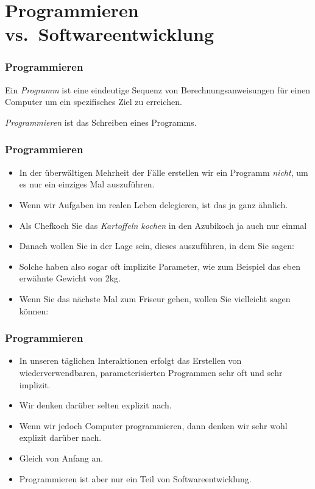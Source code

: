 \documentclass[aspectratio=169,mathserif,notheorems]{beamer}%
\begin{document}
\section{Programmieren vs.\ Softwareentwicklung}%
%
\begin{frame}%
\frametitle{Programmieren}%
%
\begin{definition}[Programm]%
Ein \emph{Programm} ist eine eindeutige Sequenz von Berechnungsanweisungen für einen Computer um ein spezifisches Ziel zu erreichen.%
\end{definition}%
%
\begin{definition}[Programmieren]%
\label{def:programming}
\emph{Programmieren} ist das Schreiben eines Programms\cite{CDE:PMOPIE}.%
\end{definition}%
%
\end{frame}%
%
\begin{frame}%
\frametitle{Programmieren}%
\begin{itemize}%
\item In der überwältigen Mehrheit der Fälle erstellen wir ein Programm \emph{nicht}, um es nur ein einziges Mal auszuführen.%
\item<2-> Wenn wir Aufgaben im realen Leben delegieren, ist das ja ganz ähnlich.
\item<3-> Als Chefkoch  Sie das  \emph{Kartoffeln kochen} in den Azubikoch ja auch nur einmal 
\item<4-> Danach wollen Sie in der Lage sein, dieses  auszuführen, in dem Sie sagen:~
\item<5-> Solche  haben also sogar oft implizite Parameter, wie zum Beispiel das eben erwähnte Gewicht von 2kg.%
\item<6-> Wenn Sie das nächste Mal zum Friseur gehen, wollen Sie vielleicht sagen können:~%
\end{itemize}%
\end{frame}%
%
\begin{frame}%
\frametitle{Programmieren}%
\begin{itemize}%
\item In unseren täglichen Interaktionen erfolgt das Erstellen von wiederverwendbaren, parameterisierten Programmen sehr oft und sehr implizit.%
\item<2-> Wir denken darüber selten explizit nach.%
\item<3-> Wenn wir jedoch Computer programmieren, dann denken wir sehr wohl explizit darüber nach.%
\item<4-> Gleich von Anfang an.%
\item<5-> \alert{Programmieren ist aber nur ein Teil von Softwareentwicklung}.
\end{itemize}%
\end{frame}%
\end{document}
